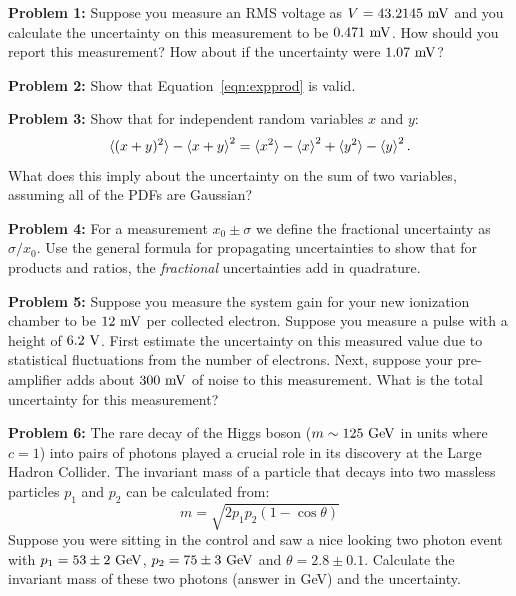 \documentclass[12pt]{article}
\begin{document}
\noindent
{\bf Problem 1:}  Suppose you measure an RMS voltage as $V = 43.2145~\rm mV$ and you calculate the uncertainty on this measurement to be $0.471~\rm mV$.  How should you report this measurement?  How about if the uncertainty were $1.07~\rm mV$? \\ \vskip 0.25cm

\noindent
{\bf Problem 2:}  Show that Equation~\ref{eqn:expprod} is valid. \\ \vskip 0.25cm

\noindent
{\bf Problem 3:}  Show that for independent random variables $x$ and $y$:
\begin{displaymath}
\braket{(x+y)^2} - \braket{x+y}^2 = \braket{x^2} - \braket{x}^2 + \braket{y^2} - \braket{y}^2.
\end{displaymath}
What does this imply about the uncertainty on the sum of two variables, assuming all of the PDFs are Gaussian? \\ \vskip 0.25cm

\noindent
{\bf Problem 4:}  For a measurement $x_0 \pm \sigma$ we define the fractional uncertainty as $\sigma/x_0$.  Use the general formula for propagating uncertainties to show that for products and ratios, the {\em fractional} uncertainties add in quadrature.  \\ \vskip 0.25cm

\noindent
{\bf Problem 5:}  Suppose you measure the system gain for your new ionization chamber to be $12~\rm mV$ per collected electron.  Suppose you measure a pulse with a height of $6.2~\rm V$.  First estimate the uncertainty on this measured value due to statistical fluctuations from the number of electrons.   Next, suppose your pre-amplifier adds about $300~\rm mV$ of noise to this measurement.  What is the total uncertainty for this measurement? \\ \vskip 0.25cm

\noindent
{\bf Problem 6:}  The rare decay of the Higgs boson ($m \sim125~\rm GeV$ in units where $c=1$) into pairs of photons played a crucial role in its discovery at the Large Hadron Collider.  The invariant mass of a particle that decays into two massless particles $p_1$ and $p_2$ can be calculated from:
\begin{displaymath}
m = \sqrt{2  p_1 p_2 (1 - \cos\theta)}
\end{displaymath}
Suppose you were sitting in the control and saw a nice looking two photon event with 
$p_1=53 \pm 2~\rm GeV$, $p_2=75 \pm 3~\rm GeV$ and $\theta = 2.8 \pm 0.1$.   Calculate the invariant mass of these two photons (answer in GeV) and the uncertainty. \\ \vskip 0.25cm
\end{document}
